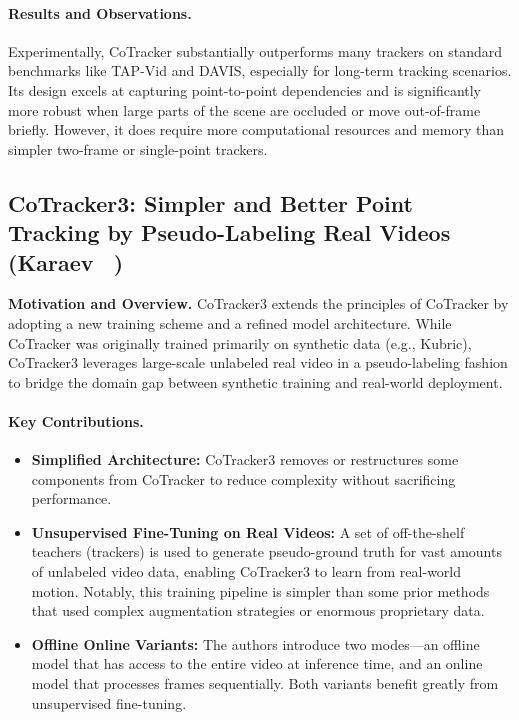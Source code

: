 \documentclass[11pt]{article}
\begin{document}
\paragraph{Results and Observations.}
Experimentally, CoTracker substantially outperforms many trackers on standard benchmarks like TAP-Vid and DAVIS, especially for long-term tracking scenarios. Its design excels at capturing point-to-point dependencies and is significantly more robust when large parts of the scene are occluded or move out-of-frame briefly. However, it does require more computational resources and memory than simpler two-frame or single-point trackers.

\subsection{CoTracker3: Simpler and Better Point Tracking by Pseudo-Labeling Real Videos (Karaev \etal~\cite{karaev2024cotracker3})}
\textbf{Motivation and Overview.}
CoTracker3 extends the principles of CoTracker by adopting a new training scheme and a refined model architecture. While CoTracker was originally trained primarily on synthetic data (e.g., Kubric), CoTracker3 leverages large-scale unlabeled real video in a pseudo-labeling fashion to bridge the domain gap between synthetic training and real-world deployment.

\paragraph{Key Contributions.}
\begin{itemize}
\item \textbf{Simplified Architecture:} CoTracker3 removes or restructures some components from CoTracker to reduce complexity without sacrificing performance. 
\item \textbf{Unsupervised Fine-Tuning on Real Videos:} A set of off-the-shelf teachers (trackers) is used to generate pseudo-ground truth for vast amounts of unlabeled video data, enabling CoTracker3 to learn from real-world motion. Notably, this training pipeline is simpler than some prior methods that used complex augmentation strategies or enormous proprietary data.
\item \textbf{Offline \vs Online Variants:} The authors introduce two modes—an offline model that has access to the entire video at inference time, and an online model that processes frames sequentially. Both variants benefit greatly from unsupervised fine-tuning.
\end{itemize}
\end{document}
